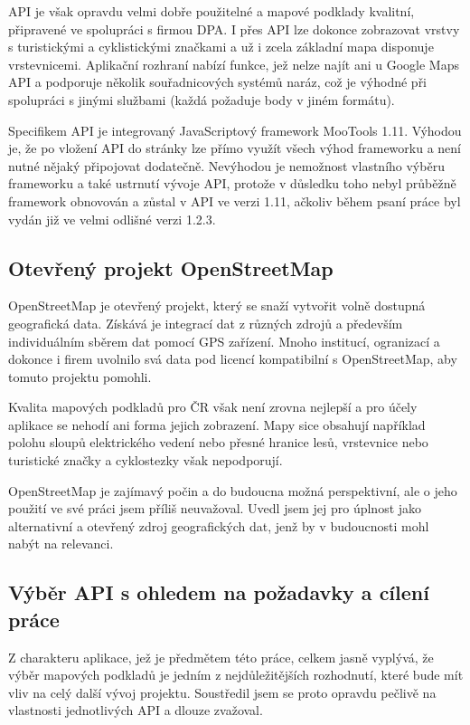 API je však opravdu velmi dobře použitelné a mapové podklady
kvalitní, připravené ve spolupráci s firmou DPA. I přes API lze
dokonce zobrazovat vrstvy s turistickými a cyklistickými značkami a už i
zcela základní mapa disponuje vrstevnicemi. Aplikační rozhraní nabízí
funkce, jež nelze najít ani u Google Maps API a podporuje několik
souřadnicových systémů naráz, což je výhodné při spolupráci s jinými
službami (každá požaduje body v jiném formátu).

Specifikem API je integrovaný JavaScriptový framework MooTools 1.11.
Výhodou je, že po vložení API do stránky lze přímo využít všech výhod
frameworku a není nutné nějaký připojovat dodatečně. Nevýhodou je
nemožnost vlastního výběru frameworku a také ustrnutí vývoje API,
protože v důsledku toho nebyl průběžně framework obnovován a zůstal
v API ve verzi 1.11, ačkoliv během psaní práce byl vydán již ve
velmi odlišné verzi 1.2.3.

\subsection{Otevřený projekt OpenStreetMap}
OpenStreetMap je otevřený projekt, který se snaží vytvořit volně
dostupná geografická data. Získává je integrací dat z různých zdrojů
a především individuálním sběrem dat pomocí GPS zařízení. Mnoho
institucí, ogranizací a dokonce i firem uvolnilo svá data pod licencí
kompatibilní s OpenStreetMap, aby tomuto projektu pomohli.

Kvalita mapových podkladů pro ČR však není zrovna nejlepší a
pro účely aplikace se nehodí ani forma jejich zobrazení. Mapy sice
obsahují například polohu sloupů elektrického vedení nebo přesné
hranice lesů, vrstevnice nebo turistické značky a cyklostezky však
nepodporují.

OpenStreetMap je zajímavý počin a do budoucna možná perspektivní, ale
o jeho použití ve své práci jsem příliš neuvažoval. Uvedl jsem jej
pro úplnost jako alternativní a otevřený zdroj geografických dat,
jenž by v budoucnosti mohl nabýt na relevanci.

\subsection{Výběr API s ohledem na požadavky a cílení
práce}\label{vybranamapa}
Z charakteru aplikace, jež je předmětem této práce, celkem jasně
vyplývá, že výběr mapových podkladů je jedním z nejdůležitějších
rozhodnutí, které bude mít vliv na celý další vývoj projektu.
Soustředil jsem se proto opravdu pečlivě na vlastnosti
jednotlivých API a dlouze zvažoval.

